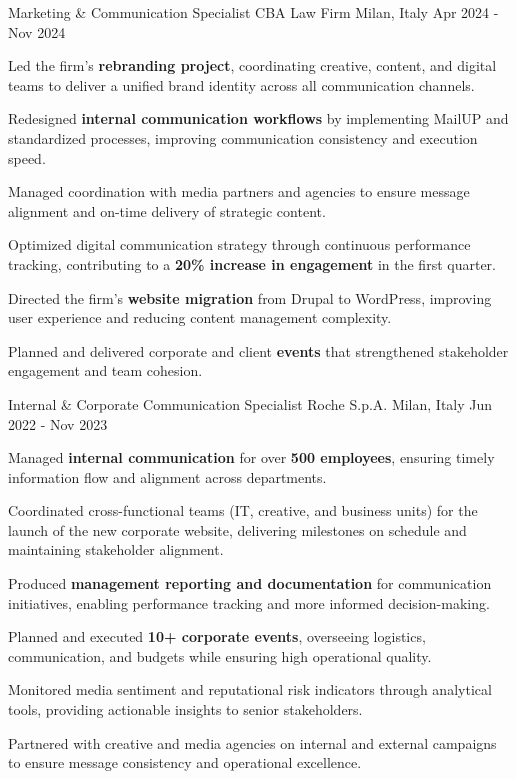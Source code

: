 \begin{cventries}
\cventry
{Marketing \& Communication Specialist} %
{CBA Law Firm} %
{Milan, Italy} %
{Apr 2024 - Nov 2024} %
{
\begin{cvitems} %
\item Led the firm’s \textbf{rebranding project}, coordinating creative, content, and digital teams to deliver a unified brand identity across all communication channels.
\item Redesigned \textbf{internal communication workflows} by implementing MailUP and standardized processes, improving communication consistency and execution speed.
\item Managed coordination with media partners and agencies to ensure message alignment and on-time delivery of strategic content.
\item Optimized digital communication strategy through continuous performance tracking, contributing to a \textbf{20\% increase in engagement} in the first quarter.
\item Directed the firm’s \textbf{website migration} from Drupal to WordPress, improving user experience and reducing content management complexity.
\item Planned and delivered corporate and client \textbf{events} that strengthened stakeholder engagement and team cohesion.
\end{cvitems}
}

\cventry
{Internal \& Corporate Communication Specialist} %
{Roche S.p.A.} %
{Milan, Italy} %
{Jun 2022 - Nov 2023} %
{
\begin{cvitems} %
\item Managed \textbf{internal communication} for over \textbf{500 employees}, ensuring timely information flow and alignment across departments.
\item Coordinated cross-functional teams (IT, creative, and business units) for the launch of the new corporate website, delivering milestones on schedule and maintaining stakeholder alignment.
\item Produced \textbf{management reporting and documentation} for communication initiatives, enabling performance tracking and more informed decision-making.
\item Planned and executed \textbf{10+ corporate events}, overseeing logistics, communication, and budgets while ensuring high operational quality.
\item Monitored media sentiment and reputational risk indicators through analytical tools, providing actionable insights to senior stakeholders.
\item Partnered with creative and media agencies on internal and external campaigns to ensure message consistency and operational excellence.
\end{cvitems}
}

\end{cventries}
